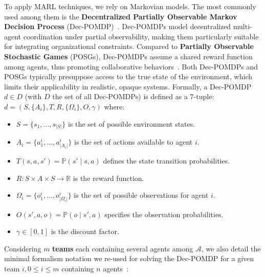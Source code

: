 \documentclass[pdflatex,sn-mathphys-num]{sn-jnl}%
\theoremstyle{thmstyleone}%
\theoremstyle{thmstyletwo}%
\theoremstyle{thmstylethree}%
\begin{document}
To apply MARL techniques, we rely on Markovian models. The most commonly used among them is the \textbf{Decentralized Partially Observable Markov Decision Process} (Dec-POMDP)~\cite{Oliehoek2016}. Dec-POMDPs model decentralized multi-agent coordination under partial observability, making them particularly suitable for integrating organizational constraints. Compared to \textbf{Partially Observable Stochastic Games} (POSGs), Dec-POMDPs assume a shared reward function among agents, thus promoting collaborative behaviors~\cite{Matignon2007}. Both Dec-POMDPs and POSGs typically presuppose access to the true state of the environment, which limits their applicability in realistic, opaque systems.
%
Formally, a Dec-POMDP $d \in D$ (with $D$ the set of all Dec-POMDPs) is defined as a 7-tuple:
%
$d = \left(S, \{A_i\}, T, R, \{\Omega_i\}, O, \gamma \right)$
%
where:
\begin{itemize}
    \item $S = \{s_1, \dots, s_{|S|}\}$ is the set of possible environment states.
    \item $A_i = \{a_1^i, \dots, a_{|A_i|}^i\}$ is the set of actions available to agent $i$.
    \item $T(s, a, s') = \mathbb{P}(s' \mid s, a)$ defines the state transition probabilities.
    \item $R: S \times A \times S \rightarrow \mathbb{R}$ is the reward function.
    \item $\Omega_i = \{o_1^i, \dots, o_{|\Omega_i|}^i\}$ is the set of possible observations for agent $i$.
    \item $O(s', a, o) = \mathbb{P}(o \mid s', a)$ specifies the observation probabilities.
    \item $\gamma \in [0, 1]$ is the discount factor.
\end{itemize}

\noindent Considering $m$ \textbf{teams} each containing several agents among $\mathcal{A}$, we also detail the minimal formalism notation we re-used for solving the Dec-POMDP for a given team $i, 0 \leq i \leq m$ containing $n$ agents~\cite{Matignon2007,Yuan2023}:
\end{document}
